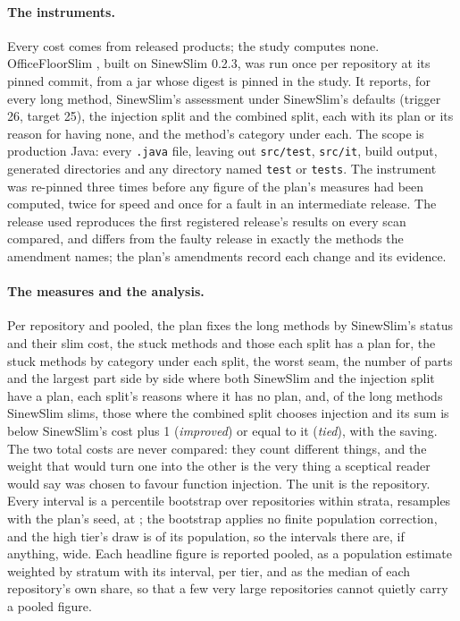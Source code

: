 \documentclass[11pt,a4paper]{article}
\newcommand{\sig}[1]{\texttt{#1}}
\begin{document}
\begin{table}[t]
\centering\small
\caption{The sample: each tier's population before the as-of date, what was drawn, what met the criteria, and the stratum weight (population over usable) used for population estimates.}
\label{tab:sample}

\end{table}

\paragraph{The instruments.} Every cost comes from released products; the
study computes none. OfficeFloorSlim \slimVersion{}, built on SinewSlim
0.2.3, was run once per repository at its pinned commit, from a jar whose
digest is pinned in the study. It reports, for every long method, SinewSlim's
assessment under SinewSlim's defaults (trigger 26, target 25), the injection
split and the combined split, each with its plan or its reason for having
none, and the method's category under each. The scope is production Java:
every \sig{.java} file, leaving out \sig{src/test}, \sig{src/it}, build
output, generated directories and any directory named \sig{test} or
\sig{tests}. The instrument was re-pinned three times before any figure of
the plan's measures had been computed, twice for speed and once for a fault
in an intermediate release. The release used reproduces the first registered
release's results on every scan compared, and differs from the faulty
release in exactly the \versDifferingMethods{} methods the amendment names;
the plan's amendments record each change and its evidence.

\paragraph{The measures and the analysis.} Per repository and pooled, the
plan fixes the long methods by SinewSlim's status and their slim cost, the
stuck methods and those each split has a plan for, the stuck methods by
category under each split, the worst seam, the number of parts and the
largest part side by side where both SinewSlim and the injection split have a
plan, each split's reasons where it has no plan, and, of the long methods
SinewSlim slims, those where the combined split chooses injection and its sum
is below SinewSlim's cost plus 1 (\emph{improved}) or equal to it
(\emph{tied}), with the saving. The two total costs are never compared: they
count different things, and the weight that would turn one into the other is
the very thing a sceptical reader would say was chosen to favour function
injection. The unit is the repository. Every interval is a percentile
bootstrap over repositories within strata, \planResamples{} resamples with
the plan's seed, at \planLevel{}; the bootstrap applies no finite population
correction, and the high tier's draw is \sampleFracHigh{} of its population,
so the intervals there are, if anything, wide. Each headline figure is
reported pooled, as a population estimate weighted by stratum with its
interval, per tier, and as the median of each repository's own share, so that
a few very large repositories cannot quietly carry a pooled figure.
\end{document}
